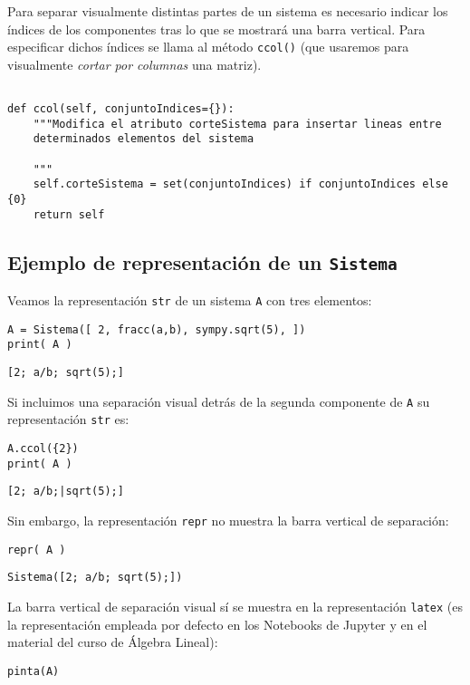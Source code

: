 \documentclass[11pt]{report}
\begin{document}
Para separar visualmente distintas partes de un sistema es necesario
indicar los índices de los componentes tras lo que se mostrará una
barra vertical. Para especificar dichos índices se llama al método
\texttt{ccol()} (que usaremos para visualmente \emph{cortar por columnas} una
matriz).
\begin{verbatim}

def ccol(self, conjuntoIndices={}):
    """Modifica el atributo corteSistema para insertar lineas entre
    determinados elementos del sistema

    """
    self.corteSistema = set(conjuntoIndices) if conjuntoIndices else {0}
    return self

\end{verbatim}

\subsection{Ejemplo de representación de un \texttt{Sistema}}
\label{sec:orga7c037d}
Veamos la representación \texttt{str} de un sistema \texttt{A} con tres elementos:
\begin{verbatim}
A = Sistema([ 2, fracc(a,b), sympy.sqrt(5), ])
print( A )
\end{verbatim}

\texttt{[2; a/b; sqrt(5);]}

Si incluimos una separación visual detrás de la segunda componente de
\texttt{A} su representación \texttt{str} es:
\begin{verbatim}
A.ccol({2})
print( A )
\end{verbatim}

\texttt{[2; a/b;|sqrt(5);]}

Sin embargo, la representación \texttt{repr} no muestra la barra vertical de
separación:
\begin{verbatim}
repr( A )
\end{verbatim}

\texttt{Sistema([2; a/b; sqrt(5);])}

La barra vertical de separación visual sí se muestra en la
representación \texttt{latex} (es la representación empleada por defecto en
los Notebooks de Jupyter y en el material del curso de Álgebra
Lineal):
\begin{verbatim}
pinta(A)
\end{verbatim}
\end{document}
